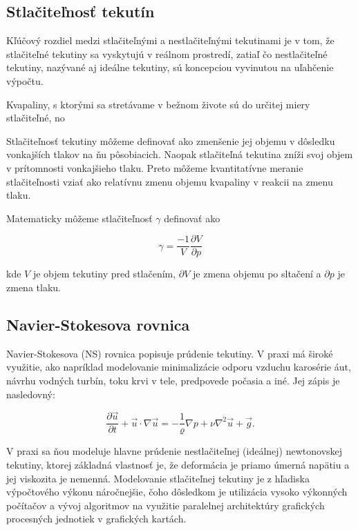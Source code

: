\documentclass[]{tukediphc}
\begin{document}
\subsection{Stlačiteľnosť tekutín}

Kľúčový rozdiel medzi stlačiteľnými a nestlačiteľnými tekutinami je v tom, že stlačiteľné tekutiny sa vyskytujú v reálnom prostredí, zatiaľ čo nestlačiteľné tekutiny, nazývané aj ideálne tekutiny, sú koncepciou vyvinutou na uľahčenie výpočtu.

Kvapaliny, s ktorými sa stretávame v bežnom živote sú do určitej miery stlačiteľné, no 


Stlačiteľnosť tekutiny môžeme definovať ako zmenšenie jej objemu v dôsledku vonkajších tlakov na ňu pôsobiacich. Naopak stlačiteľná tekutina zníži svoj objem v prítomnosti vonkajšieho tlaku. Preto môžeme kvantitatívne meranie stlačiteľnosti vziať ako relatívnu zmenu objemu kvapaliny v reakcii na zmenu tlaku.

Matematicky môžeme stlačiteľnosť $\gamma$ definovať ako

\begin{equation}
	\gamma = \frac{-1}{V} \frac{\partial V}{\partial p}
\end{equation}

kde $V$ je objem tekutiny pred stlačením, $\partial V$ je zmena objemu po sltačení a $\partial p$ je zmena tlaku.

\subsection{Navier-Stokesova rovnica}

Navier-Stokesova (NS) rovnica popisuje prúdenie tekutiny. V praxi má široké využitie, ako napríklad modelovanie minimalizácie odporu vzduchu karosérie áut, návrhu vodných turbín, toku krvi v tele, predpovede počasia a iné. Jej zápis je nasledovný:

\begin{equation}
\frac{\partial \vec{u}}{\partial t} + \vec{u} \cdot \nabla \vec{u} = - \frac{1}{\varrho} \nabla p + \nu \nabla^2 \vec{u} + \vec{g}.
\end{equation}

V praxi sa ňou modeluje hlavne prúdenie nestlačiteľnej (ideálnej) newtonovskej tekutiny, ktorej základná vlastnosť je, že deformácia je priamo úmerná napätiu a jej viskozita je nemenná. Modelovanie stlačiteľnej tekutiny je z hľadiska výpočtového výkonu náročnejšie, čoho dôsledkom je utilizácia vysoko výkonných počítačov a vývoj algoritmov na využitie paralelnej architektúry grafických procesných jednotiek v grafických kartách.
\end{document}
